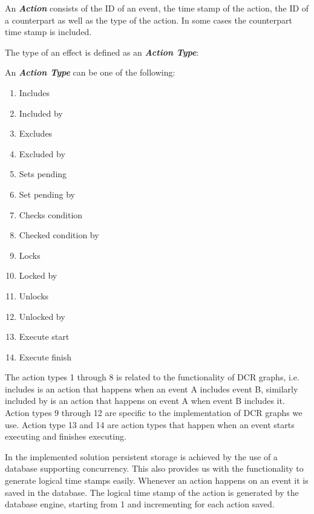 	\begin{definition}
		An \textit{\textbf{Action}} consists of the ID of an event, the time stamp of the action, the ID of a counterpart as well as  the type of the action. In some cases the counterpart time stamp is included.
	\end{definition}
	
	\newpar	The type of an effect is defined as an \textit{\textbf{Action Type}}:
	
	\begin{definition}
		An \textit{\textbf{Action Type}} can be one of the following:
		\begin{multicols}{3}
			\begin{enumerate}
				\item Includes
				\item Included by
				\item Excludes
				\item Excluded by
				\item Sets pending
				\item Set pending by
				\item Checks condition
				\item Checked condition by
				\item Locks
				\item Locked by
				\item Unlocks
				\item Unlocked by
				\item Execute start
				\item Execute finish
			\end{enumerate}
		\end{multicols}
	\end{definition}
	
	\newpar The action types 1 through 8 is related to the functionality of DCR graphs, i.e. includes is an action that happens when an event A includes event B, similarly included by is an action that happens on event A when event B includes it. Action types 9 through 12 are specific to the implementation of DCR graphs we use. Action type 13 and 14 are action types that happen when an event starts executing and finishes executing.
	
	\newpar In the implemented solution persistent storage is achieved by the use of a database supporting concurrency. This also provides us with the functionality to generate logical time stamps easily. Whenever an action happens on an event it is saved in the database. The logical time stamp of the action is generated by the database engine, starting from 1 and incrementing for each action saved.
	
